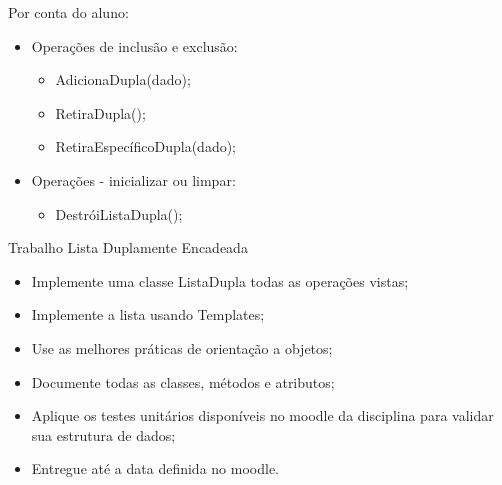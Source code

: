 \documentclass[12pt,table,xcolor={dvipsnames}]{beamer}
\begin{document}
\begin{frame}[fragile]{Por conta do aluno:}

\begin{itemize}
\item Operações de inclusão e exclusão:
\begin{itemize}
\item AdicionaDupla(dado);
\item RetiraDupla();
\item RetiraEspecíficoDupla(dado);
\end{itemize}
\item Operações - inicializar ou limpar:
\begin{itemize}
\item DestróiListaDupla();
\end{itemize}
\end{itemize}
\end{frame}

\begin{frame}[fragile]{Trabalho Lista Duplamente Encadeada}
\begin{itemize}
\item Implemente uma classe ListaDupla todas as operações vistas;
\item Implemente a lista usando Templates;
\item Use as melhores práticas de orientação a objetos;
\item Documente todas as classes, métodos e atributos;
\item Aplique os testes unitários disponíveis no moodle da disciplina para validar sua estrutura de dados;
\item Entregue até a data definida no moodle.
\end{itemize}
\end{frame}
\end{document}
